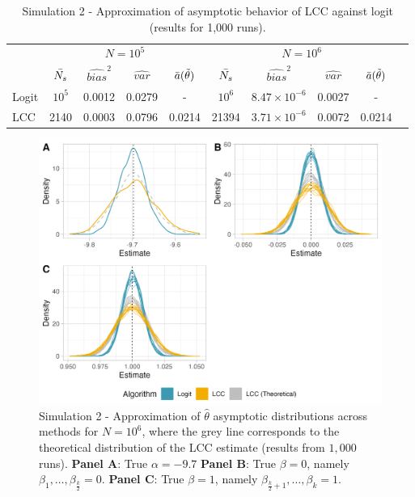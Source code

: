 \begin{table}[ht]
\centering
\begin{tabular}{lccccccccc}
    \toprule
    & \multicolumn{4}{c}{$N=10^5$} & \multicolumn{4}{c}{$N=10^6$}\\
    \cmidrule(lr){2-5}\cmidrule(lr){6-9}
    \multicolumn{1}{c}{} & \multicolumn{1}{c}{$\Bar{N_s}$} &\multicolumn{1}{c}{$\widehat{bias}^2$} & \multicolumn{1}{c}{$\widehat{var}$} & \multicolumn{1}{c}{$\Bar{a}(\Tilde{\theta})$} & \multicolumn{1}{c}{$\Bar{N_s}$} &\multicolumn{1}{c}{$\widehat{bias}^2$} & \multicolumn{1}{c}{$\widehat{var}$} & \multicolumn{1}{c}{$\Bar{a}(\Tilde{\theta})$}\\
    \midrule
    Logit & $10^5$ & 0.0012 & 0.0279 & -
    & $10^6$ & $8.47 \times 10^{-6}$ & 0.0027 & -\\
    LCC & 2140 & 0.0003 & 0.0796 &  0.0214 
    & 21394 & $3.71\times 10^{-6}$ & 0.0072 & 0.0214\\
    \bottomrule
\end{tabular}
\caption[Simulation 2 - Approximation of asymptotic behavior of LCC against logit]{Simulation 2 - Approximation of asymptotic behavior of LCC against logit (results for 1,000 runs).}
\label{tab:sim2}
\end{table}

\begin{figure}[ht]
    \centering
    \includegraphics[width=\textwidth]{2_Figures/all_densities.png}
    \caption[Simulation 2 - Distribution of Monte Carlo realizations $\hat{\theta}_{logit}$, $\hat{\theta}_{LCC}$ and theoretical $\hat{\theta}_{LCC}$]{Simulation 2 - Approximation of $\hat{\theta}$ asymptotic distributions across methods for $N=10^6$, where the grey line corresponds to the theoretical distribution of the LCC estimate (results from $1,000$ runs). \textbf{Panel A}: True $\alpha=-9.7$ 
    \textbf{Panel B}: True $\beta=0$, namely $\beta_1, \dots, \beta_{\frac{k}{2}}=0$. 
    \textbf{Panel C}: True $\beta=1$, namely $\beta_{\frac{k}{2}+1}, \dots, \beta_k=1$.}
    \label{fig:all_densities}
\end{figure}


